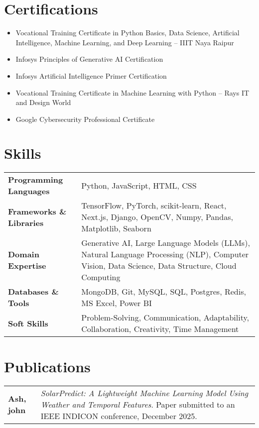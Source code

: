 \documentclass[a4paper,12pt]{article}
\begin{document}
\section{Certifications}
\begin{itemize}[nosep,after=\strut, leftmargin=1em, itemsep=3pt]
\item Vocational Training Certificate in Python Basics, Data Science, Artificial Intelligence, Machine Learning, and Deep Learning – IIIT Naya Raipur
    \item Infosys Principles of Generative AI Certification
    \item Infosys Artificial Intelligence Primer Certification
    \item Vocational Training Certificate in Machine Learning with Python – Rays IT and Design World
    \item Google Cybersecurity Professional Certificate
    
\end{itemize}

\section{Skills}
\begin{tabularx}{\linewidth}{@{}l X@{}}
\textbf{Programming Languages} & Python, JavaScript, HTML, CSS \\
\textbf{Frameworks \& Libraries} & TensorFlow, PyTorch, scikit-learn, React, Next.js, Django, OpenCV, Numpy, Pandas, Matplotlib, Seaborn \\
\textbf{Domain Expertise} & Generative AI, Large Language Models (LLMs), Natural Language Processing (NLP), Computer Vision, Data Science, Data Structure, Cloud Computing \\
\textbf{Databases \& Tools} & MongoDB, Git, MySQL, SQL, Postgres, Redis, MS Excel, Power BI \\
\textbf{Soft Skills} & Problem-Solving, Communication, Adaptability, Collaboration, Creativity, Time Management \\
\end{tabularx}

\section{Publications}
\begin{tabularx}{\linewidth}{@{}l X@{}}
\textbf{Ash, john} & \textit{SolarPredict: A Lightweight Machine Learning Model Using Weather and Temporal Features}. Paper submitted to an IEEE INDICON conference, December 2025.
\end{tabularx}

\vfill
{}
\end{document}

